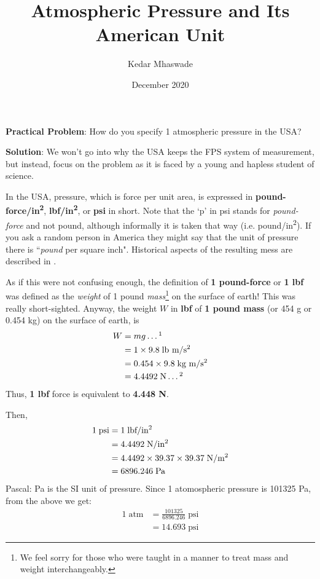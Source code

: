 \documentclass[a6paper]{article}
\begin{document}
\title{Atmospheric Pressure and Its American Unit}
\author{Kedar Mhaswade}
\date{December 2020}
\maketitle
\textbf{Practical Problem}: 
How do you specify 1 atmospheric pressure in the USA?

\textbf{Solution}:
We won't go into why the USA keeps the FPS system of measurement, but instead, focus on the problem as it is faced by a young and hapless student of science.

In the USA, pressure, which is force per unit area, is expressed in \textbf{pound-force/in\textsuperscript{2}}, \textbf{lbf/in\textsuperscript{2}}, or \textbf{psi} in short. Note that the `p' in psi stands for \emph{pound-force} and not pound, although informally it is taken that way (i.e. pound/in\textsuperscript{2}). If you ask a random person in America they might say that the unit of pressure there is ``\emph{pound} per square inch". Historical aspects of the resulting mess are described in \cite{esu}.

As if this were not confusing enough, the definition of \textbf{1 pound-force} or \textbf{1 lbf} was defined as the \emph{weight} of 1 pound \emph{mass}\footnote{We feel sorry for those who were taught in a manner to treat mass and weight interchangeably.} on the surface of earth! This was really short-sighted. Anyway, the weight $W$ in \textbf{lbf} of \textbf{1 pound mass} (or 454 \si{\gram} or 0.454 \si{\kg}) on the surface of earth, is 
\begin{align*}
    W 
    &= mg \dots \footnotemark\\
    &= 1\times 9.8 \; \text{lb m/s\textsuperscript{2}} \\
    &= 0.454\times 9.8\; \text{kg m/s\textsuperscript{2}}\\
    &= 4.4492\; \text{N} \dots \footnotemark
\end{align*}
Thus, \textbf{1 lbf} force is equivalent to \textbf{4.448 \si{\newton}}.

Then, 
\begin{align*}
    1 \; \text{psi} 
    &= 1 \; \text{lbf/in\textsuperscript{2}} \\
    &= 4.4492 \; \text{N/in\textsuperscript{2}} \\
    &= 4.4492 \times 39.37 \times 39.37\; \text{N/m\textsuperscript{2}} \\
    &= 6896.246 \; \si{\pascal}
\end{align*}
Pascal: \si{\pascal} is the SI unit of pressure. Since 1 atomospheric pressure is 101325 \si{\pascal}, from the above we get:
\begin{align*}
    1 \; \text{atm} 
    &= \frac{101325}{6896.246} \;\text{psi} \\
    &= 14.693 \; \text{psi}
\end{align*}
\end{document}
